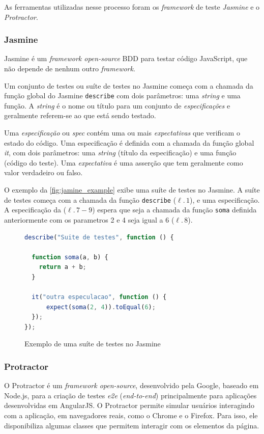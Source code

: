 As ferramentas utilizadas nesse processo foram os \textit{framework} de teste \textit{Jasmine} e o \textit{Protractor}.

\subsubsection{Jasmine}

Jasmine é um \textit{framework open-source} BDD para testar código JavaScript, que não depende de nenhum outro \textit{framework}.

Um conjunto de testes ou suíte de testes no Jasmine começa com a chamada da função global do Jasmine
\texttt{describe} com dois parâmetros: uma \textit{string} e uma função. A \textit{string} é o nome ou título
para um conjunto de \textit{especificações} e geralmente referem-se ao que está sendo testado.

Uma \textit{especificação} ou \textit{spec} contém uma ou mais \textit{expectativas} que verificam o estado do código.
Uma especificação é definida com a chamada da função global \textit{it}, com dois parâmetros: uma \textit{string} (título da
especificação) e uma função (código do teste).
Uma \textit{expectativa} é uma asserção que tem geralmente como valor verdadeiro ou falso.

O exemplo da \autoref{fig:jamine_example} exibe uma suíte de testes no Jasmine. A suíte de
testes começa com a chamada da função \texttt{describe} ($\ell.\,1$), e uma especificação.
A especificação da ($\ell.\,7-9$) espera que seja a chamada da função \texttt{soma} definida
anteriormente com os parametros 2 e 4 seja igual a 6 ($\ell.\,8$).

\begin{figure}[!ht]
\caption{Exemplo de uma suíte de testes no Jasmine}
\label{fig:jamine_example}
\begin{lstlisting}[language=JavaScript]
describe("Suite de testes", function () {

  function soma(a, b) {
    return a + b;
  }

  it("outra especulacao", function () {
      expect(soma(2, 4)).toEqual(6);
  });
});
\end{lstlisting}
\doautor
\end{figure}

\subsubsection{Protractor}

O Protractor é um \textit{framework open-source}, desenvolvido pela Google, baseado em Node.js, para a criação de testes
\textit{e2e} (\textit{end-to-end})
principalmente para aplicações desenvolvidas em AngularJS. O Protractor permite simular usuários interagindo com a
aplicação, em navegadores reais, como o Chrome e o Firefox. Para isso, ele disponibiliza algumas classes
que permitem interagir com os elementos da página.

